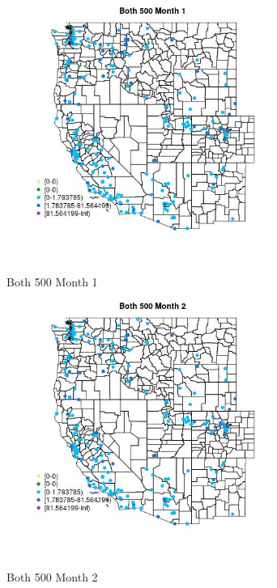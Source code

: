 \begin{figure} 
\centering  
\includegraphics[width=0.77\textwidth]{Code_Outputs/Report_ML_input_PM25_Step4_part_e_de_duplicated_aveswNAs_MapObsMo1Both_500.jpg} 
\caption{\label{fig:Report_ML_input_PM25_Step4_part_e_de_duplicated_aveswNAsMapObsMo1Both_500}Both 500 Month 1} 
\end{figure} 
 

\clearpage 

\begin{figure} 
\centering  
\includegraphics[width=0.77\textwidth]{Code_Outputs/Report_ML_input_PM25_Step4_part_e_de_duplicated_aveswNAs_MapObsMo2Both_500.jpg} 
\caption{\label{fig:Report_ML_input_PM25_Step4_part_e_de_duplicated_aveswNAsMapObsMo2Both_500}Both 500 Month 2} 
\end{figure} 
 

